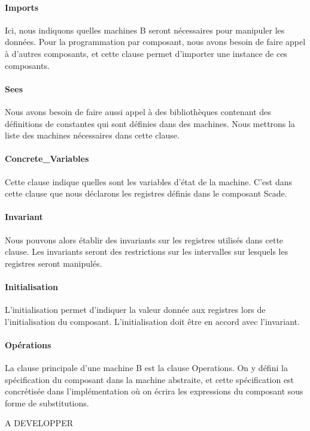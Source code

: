 \paragraph{Imports}
Ici, nous indiquons quelles machines B seront nécessaires pour
manipuler les données. Pour la programmation par composant, nous avons
besoin de faire appel à d'autres composants, et cette clause permet
d'importer une instance de ces composants.

\paragraph{Sees}
Nous avons besoin de faire aussi appel à des bibliothèques contenant
des définitions de constantes qui sont définies dans des
machines. Nous mettrons la liste des machines nécessaires dans cette
clause.  

\paragraph{Concrete\_Variables}
Cette clause indique quelles sont les variables d'état de la
machine. C'est dans cette clause que nous déclarons les registres
définis dans le composant Scade. 

\paragraph{Invariant}
Nous pouvons alors établir des invariants sur les registres utilisés
dans cette clause. Les invariants seront des restrictions sur les
intervalles sur lesquels les registres seront manipulés.

\paragraph{Initialisation}
L'initialisation permet d'indiquer la valeur donnée aux registres lors
de l'initialisation du composant. L'initialisation doit être en accord
avec l'invariant.

\paragraph{Opérations}
La clause principale d'une machine B est la clause Operations. On y
défini la spécification du composant dans la machine abstraite, et
cette spécification est concrétisée dans l'implémentation où on écrira
les expressions du composant sous forme de substitutions.

A DEVELOPPER



